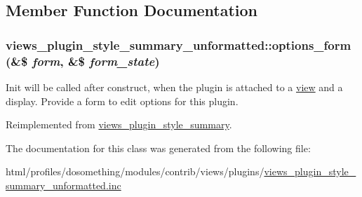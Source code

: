 \subsection{Member Function Documentation}
\hypertarget{classviews__plugin__style__summary__unformatted_a8770285dac047bf88a2c77b2e798826d}{
\subsubsection[{options\_\-form}]{\setlength{\rightskip}{0pt plus 5cm}views\_\-plugin\_\-style\_\-summary\_\-unformatted::options\_\-form (\&\$ {\em form}, \/  \&\$ {\em form\_\-state})}}
\label{classviews__plugin__style__summary__unformatted_a8770285dac047bf88a2c77b2e798826d}
Init will be called after construct, when the plugin is attached to a \hyperlink{classview}{view} and a display. Provide a form to edit options for this plugin. 

Reimplemented from \hyperlink{classviews__plugin__style__summary_a43826183b4d54242ae5276f40f70475f}{views\_\-plugin\_\-style\_\-summary}.

The documentation for this class was generated from the following file:\begin{DoxyCompactItemize}
\item 
html/profiles/dosomething/modules/contrib/views/plugins/\hyperlink{views__plugin__style__summary__unformatted_8inc}{views\_\-plugin\_\-style\_\-summary\_\-unformatted.inc}\end{DoxyCompactItemize}
